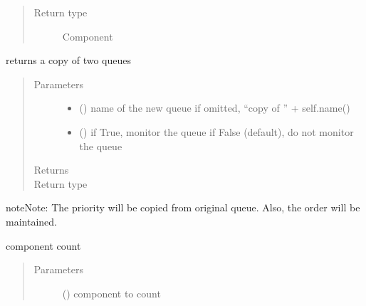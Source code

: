\documentclass[letterpaper,10pt,english]{sphinxmanual}
\begin{document}
\begin{fulllineitems}
\begin{fulllineitems}
\begin{quote}
\begin{description}
\item[{Return type}] \leavevmode
Component 

\end{description}\end{quote}

\end{fulllineitems}


\begin{fulllineitems}
\label{\detokenize{Reference:salabim.Queue.copy}}
returns a copy of two queues
\begin{quote}\begin{description}
\item[{Parameters}] \leavevmode\begin{itemize}
\item {} 
 () \textendash{} name of the new queue 
if omitted, “copy of ” + self.name()

\item {} 
 () \textendash{} if True, monitor the queue 
if False (default), do not monitor the queue

\end{itemize}

\item[{Returns}] \leavevmode
{}

\item[{Return type}] \leavevmode
{\hyperref[\detokenize{Reference:salabim.Queue}]{}}

\end{description}\end{quote}

\begin{sphinxadmonition}{note}{Note:}
The priority will be copied from original queue.
Also, the order will be maintained.
\end{sphinxadmonition}

\end{fulllineitems}


\begin{fulllineitems}
\label{\detokenize{Reference:salabim.Queue.count}}
component count
\begin{quote}\begin{description}
\item[{Parameters}] \leavevmode
{} ({\hyperref[\detokenize{Reference:salabim.Component}]{}}) \textendash{} component to count


\end{description}
\end{quote}
\end{fulllineitems}
\end{fulllineitems}
\end{document}
